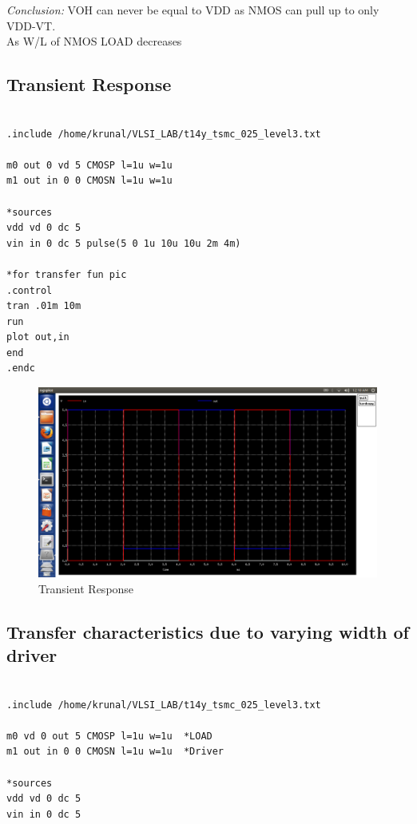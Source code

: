 \documentclass[12pt,a4paper]{article}
\begin{document}
\begin{center}
\textit{Conclusion:}
VOH can never be equal to VDD as NMOS can pull up to only VDD-VT.
\\ As W/L of NMOS LOAD decreases 
\subsection{Transient Response}

\begin{lstlisting}

.include /home/krunal/VLSI_LAB/t14y_tsmc_025_level3.txt

m0 out 0 vd 5 CMOSP l=1u w=1u
m1 out in 0 0 CMOSN l=1u w=1u

*sources
vdd vd 0 dc 5 
vin in 0 dc 5 pulse(5 0 1u 10u 10u 2m 4m)

*for transfer fun pic
.control
tran .01m 10m
run
plot out,in
end
.endc

\end{lstlisting}
\begin{figure}[!ht]
\centering
\includegraphics[scale=0.37]{lab3_pic3_2_transient_response.png}

\caption[Short]{Transient Response}
\end{figure}
\subsection{Transfer characteristics due to varying width of driver}

\begin{lstlisting}

.include /home/krunal/VLSI_LAB/t14y_tsmc_025_level3.txt

m0 vd 0 out 5 CMOSP l=1u w=1u  *LOAD 
m1 out in 0 0 CMOSN l=1u w=1u  *Driver

*sources
vdd vd 0 dc 5 
vin in 0 dc 5 


\end{lstlisting}
\end{center}
\end{document}
